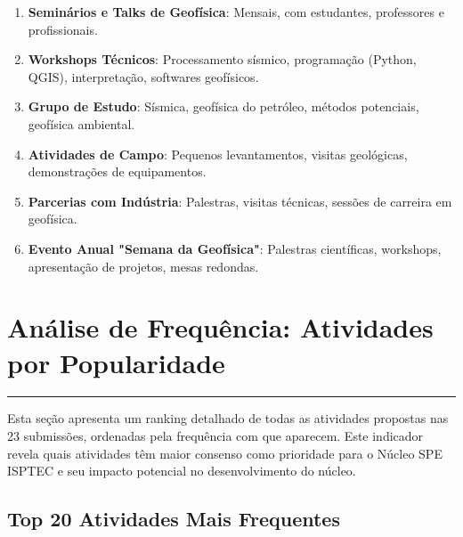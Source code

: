 \documentclass[12pt,a4paper]{article}
\begin{document}
\begin{enumerate}[itemsep=0.2cm]
    \item \textbf{Seminários e Talks de Geofísica}: Mensais, com estudantes, professores e profissionais.
    
    \item \textbf{Workshops Técnicos}: Processamento sísmico, programação (Python, QGIS), interpretação, softwares geofísicos.
    
    \item \textbf{Grupo de Estudo}: Sísmica, geofísica do petróleo, métodos potenciais, geofísica ambiental.
    
    \item \textbf{Atividades de Campo}: Pequenos levantamentos, visitas geológicas, demonstrações de equipamentos.
    
    \item \textbf{Parcerias com Indústria}: Palestras, visitas técnicas, sessões de carreira em geofísica.
    
    \item \textbf{Evento Anual "Semana da Geofísica"}: Palestras científicas, workshops, apresentação de projetos, mesas redondas.
\end{enumerate}

\clearpage


\newpage
\section{Análise de Frequência: Atividades por Popularidade}
\textcolor{spe-secondary}{\rule{\linewidth}{0.5pt}}

Esta seção apresenta um ranking detalhado de todas as atividades propostas nas 23 submissões, ordenadas pela frequência com que aparecem. Este indicador revela quais atividades têm maior consenso como prioridade para o Núcleo SPE ISPTEC e seu impacto potencial no desenvolvimento do núcleo.

\subsection{Top 20 Atividades Mais Frequentes}
\end{document}
